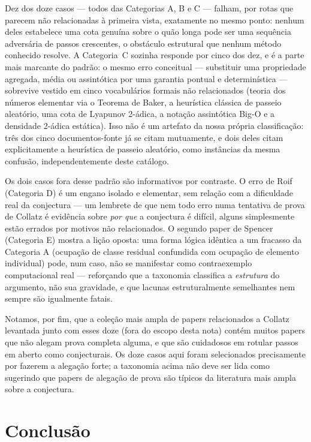 \documentclass[11pt]{article}
\begin{document}
Dez dos doze casos --- todos das Categorias A, B e C --- falham, por
rotas que parecem não relacionadas à primeira vista, exatamente no
mesmo ponto: nenhum deles estabelece uma cota genuína sobre o quão
longa pode ser uma sequência adversária de passos crescentes, o
obstáculo estrutural que nenhum método conhecido resolve. A
Categoria~C sozinha responde por cinco dos dez, e é a parte mais
marcante do padrão: o mesmo erro conceitual --- substituir uma
propriedade agregada, média ou assintótica por uma garantia pontual e
determinística --- sobrevive vestido em cinco vocabulários formais não
relacionados (teoria dos números elementar via o Teorema de Baker, a
heurística clássica de passeio aleatório, uma cota de Lyapunov
2-ádica, a notação assintótica Big-O e a densidade 2-ádica estática).
Isso não é um artefato da nossa própria classificação: três dos cinco
documentos-fonte já se citam mutuamente, e dois deles citam
explicitamente a heurística de passeio aleatório, como instâncias da
mesma confusão, independentemente deste catálogo.

Os dois casos fora desse padrão são informativos por contraste. O erro
de Roif (Categoria D) é um engano isolado e elementar, sem relação com
a dificuldade real da conjectura --- um lembrete de que nem todo erro
numa tentativa de prova de Collatz é evidência sobre \emph{por que} a
conjectura é difícil, alguns simplesmente estão errados por motivos
não relacionados. O segundo paper de Spencer (Categoria E) mostra a
lição oposta: uma forma lógica idêntica a um fracasso da Categoria A
(ocupação de classe residual confundida com ocupação de elemento
individual) pode, num caso, não se manifestar como contraexemplo
computacional real --- reforçando que a taxonomia classifica a
\emph{estrutura} do argumento, não sua gravidade, e que lacunas
estruturalmente semelhantes nem sempre são igualmente fatais.

Notamos, por fim, que a coleção mais ampla de papers relacionados a
Collatz levantada junto com esses doze (fora do escopo desta nota)
contém muitos papers que não alegam prova completa alguma, e que são
cuidadosos em rotular passos em aberto como conjecturais. Os doze casos
aqui foram selecionados precisamente por fazerem a alegação forte; a
taxonomia acima não deve ser lida como sugerindo que papers de alegação
de prova são típicos da literatura mais ampla sobre a conjectura.

\section{Conclusão}
\label{sec:conclusion}
\end{document}
